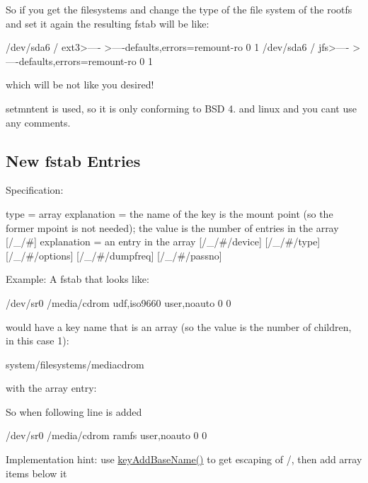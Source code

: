 So if you get the filesystems and change the type of the file system of the rootfs and set it again the resulting fstab will be like\+: \begin{DoxyVerb}/dev/sda6       /               ext3>----   >----defaults,errors=remount-ro 0 1
/dev/sda6       /               jfs>----   >----defaults,errors=remount-ro 0 1
\end{DoxyVerb}


which will be not like you desired!

setmntent is used, so it is only conforming to B\+SD 4. and linux and you can\textquotesingle{}t use any comments.

\subsection*{New fstab Entries}

Specification\+: \begin{DoxyVerb}[/_]
type = array
explanation = the name of the key is the mount point (so the former
  mpoint is not needed); the value is the number of entries in the
  array
[/_/#]
explanation = an entry in the array
[/_/#/device]
[/_/#/type]
[/_/#/options]
[/_/#/dumpfreq]
[/_/#/passno]
\end{DoxyVerb}


Example\+: A fstab that looks like\+: \begin{DoxyVerb}/dev/sr0        /media/cdrom   udf,iso9660 user,noauto     0       0
\end{DoxyVerb}


would have a key name that is an array (so the value is the number of children, in this case 1)\+: \begin{DoxyVerb}system/filesystems/\/media\/cdrom
\end{DoxyVerb}


with the array entry\+: 


So when following line is added \begin{DoxyVerb}/dev/sr0        /media/cdrom   ramfs user,noauto     0       0
\end{DoxyVerb}


Implementation hint\+: use {\ttfamily \hyperlink{group__keyname_gaa942091fc4bd5c2699e49ddc50829524}{key\+Add\+Base\+Name()}} to get escaping of {\ttfamily /}, then add array items below it

